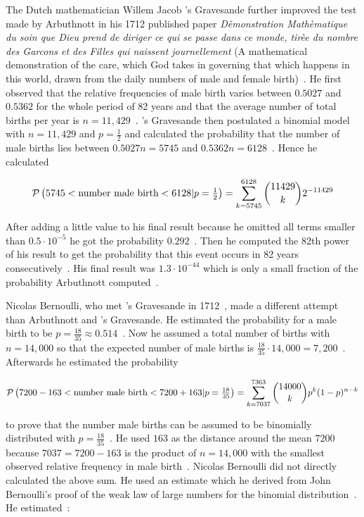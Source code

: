 The Dutch mathematician Willem Jacob 's Gravesande further improved the test made by Arbuthnott in his 1712 published paper \emph{Dèmonstration Mathèmatique du soin que Dieu prend de diriger ce qui se passe dans ce monde, tirèe du nombre des Garcons et des Filles qui naissent journellement} (A mathematical demonstration of the care, which God takes in governing that which happens in this world, drawn from the daily numbers of male and female birth)~\cite[p. 279]{hald1}. He first observed that the relative frequencies of male birth varies between $0.5027$ and $0.5362$ for the whole period of 82 years and that the average number of total births per year is $n=11,429$~\cite[p. 279]{hald1}. 's Gravesande then postulated a binomial model with $n=11,429$ and $p=\tfrac 12$ and calculated the probability that the number of male births lies between $0.5027n=5745$ and $0.5362n=6128$~\cite[p. 280]{hald1}. Hence he calculated

\begin{align}
    \P{5745 < \text{number male birth} < 6128|p=\tfrac 12} = \sum_{k=5745}^{6128} \binom{11429} k 2^{-11429}
\end{align}

After adding a little value to his final result because he omitted all terms smaller than $0.5\cdot 10^{-5}$ he got the probability $0.292$~\cite[p. 280]{hald1}. Then he computed the 82th power of his result to get the probability that this event occurs in 82 years consecutively~\cite[p. 280]{hald1}. His final result was $1.3\cdot10^{-44}$ which is only a small fraction of the probability Arbuthnott computed~\cite[p. 280]{hald1}.

Nicolas Bernoulli, who met 's Gravesande in 1712~\cite[p. 279]{hald1}, made a different attempt than Arbuthnott and 's Gravesande. He estimated the probability for a male birth to be $p=\tfrac{18}{35}\approx0.514$~\cite[p. 282]{hald1}. Now he assumed a total number of births with $n=14,000$ so that the expected number of male births is $\tfrac{18}{35}\cdot 14,000=7,200$~\cite[p. 282]{hald1}. Afterwards he estimated the probability

\begin{align}
    \P{7200-163 < \text{number male birth} < 7200+163|p=\tfrac{18}{35}} = \sum_{k=7037}^{7363} \binom {14000}{k} p^k (1-p)^{n-k}
\end{align}

to prove that the number male births can be assumed to be binomially distributed with $p=\tfrac{18}{35}$~\cite[pp. 281-282]{hald1}. He used $163$ as the distance around the mean $7200$ because $7037=7200-163$ is the product of $n=14,000$ with the smallest observed relative frequency in male birth~\cite[p. 282]{hald1}. Nicolas Bernoulli did not directly calculated the above sum. He used an estimate which he derived from John Bernoulli's proof of the weak law of large numbers for the binomial distribution~\cite[pp. 264-267]{hald1}. He estimated~\cite[p. 282]{hald1}:

